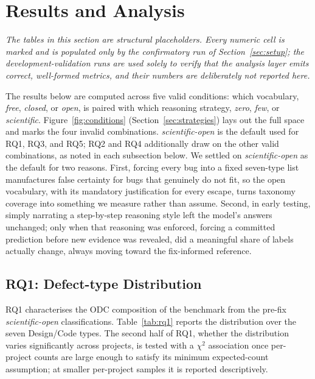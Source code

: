 \section{Results and Analysis}
\label{sec:results}

\noindent\emph{The tables in this section are structural placeholders. Every
numeric cell is marked \TBD{} and is populated only by the confirmatory run of
Section~\ref{sec:setup}; the development-validation runs are used solely to verify
that the analysis layer emits correct, well-formed metrics, and their numbers are
deliberately not reported here.}

The results below are computed across five valid conditions: which vocabulary,
\textit{free}, \textit{closed}, or \textit{open}, is paired with which
reasoning strategy, \textit{zero}, \textit{few}, or \textit{scientific}.
Figure~\ref{fig:conditions} (Section~\ref{sec:strategies}) lays out the full
space and marks the four invalid combinations. \textit{scientific-open} is the
default used for RQ1, RQ3, and RQ5; RQ2 and RQ4 additionally draw on the other
valid combinations, as noted in each subsection below. We settled on
\textit{scientific-open} as the default for two reasons. First, forcing every
bug into a fixed seven-type list manufactures false certainty for bugs that
genuinely do not fit, so the open vocabulary, with its mandatory justification
for every escape, turns taxonomy coverage into something we measure rather than
assume. Second, in early testing, simply narrating a step-by-step reasoning
style left the model's answers unchanged; only when that reasoning was
enforced, forcing a committed prediction before new evidence was revealed, did
a meaningful share of labels actually change, always moving toward the
fix-informed reference.

\subsection{RQ1: Defect-type Distribution}

RQ1 characterises the ODC composition of the benchmark from the pre-fix
\textit{scientific-open} classifications. Table~\ref{tab:rq1} reports the
distribution over the seven Design/Code types. The second half of RQ1, whether
the distribution varies significantly across projects, is tested with a
$\chi^2$ association once per-project counts are large enough to satisfy its
minimum expected-count assumption; at smaller per-project samples it is reported
descriptively.

